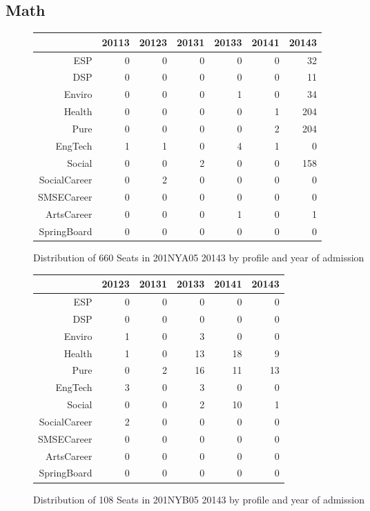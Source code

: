 \documentclass{article}\usepackage[]{graphicx}\usepackage[]{color}
\begin{document}
\subsection{Math}
\begin{figure}[H]
\centering
\begin{tabular}{rrrrrrr}
  \hline
 & 20113 & 20123 & 20131 & 20133 & 20141 & 20143 \\ 
  \hline
ESP &   0 &   0 &   0 &   0 &   0 &  32 \\ 
  DSP &   0 &   0 &   0 &   0 &   0 &  11 \\ 
  Enviro &   0 &   0 &   0 &   1 &   0 &  34 \\ 
  Health &   0 &   0 &   0 &   0 &   1 & 204 \\ 
  Pure &   0 &   0 &   0 &   0 &   2 & 204 \\ 
  EngTech &   1 &   1 &   0 &   4 &   1 &   0 \\ 
  Social &   0 &   0 &   2 &   0 &   0 & 158 \\ 
  SocialCareer &   0 &   2 &   0 &   0 &   0 &   0 \\ 
  SMSECareer &   0 &   0 &   0 &   0 &   0 &   0 \\ 
  ArtsCareer &   0 &   0 &   0 &   1 &   0 &   1 \\ 
  SpringBoard &   0 &   0 &   0 &   0 &   0 &   0 \\ 
   \hline
\end{tabular}
\caption{Distribution of 660 Seats in 201NYA05 20143 by profile and year of admission} 
\end{figure}
\begin{figure}[H]
\centering
\begin{tabular}{rrrrrr}
  \hline
 & 20123 & 20131 & 20133 & 20141 & 20143 \\ 
  \hline
ESP &   0 &   0 &   0 &   0 &   0 \\ 
  DSP &   0 &   0 &   0 &   0 &   0 \\ 
  Enviro &   1 &   0 &   3 &   0 &   0 \\ 
  Health &   1 &   0 &  13 &  18 &   9 \\ 
  Pure &   0 &   2 &  16 &  11 &  13 \\ 
  EngTech &   3 &   0 &   3 &   0 &   0 \\ 
  Social &   0 &   0 &   2 &  10 &   1 \\ 
  SocialCareer &   2 &   0 &   0 &   0 &   0 \\ 
  SMSECareer &   0 &   0 &   0 &   0 &   0 \\ 
  ArtsCareer &   0 &   0 &   0 &   0 &   0 \\ 
  SpringBoard &   0 &   0 &   0 &   0 &   0 \\ 
   \hline
\end{tabular}
\caption{Distribution of 108 Seats in 201NYB05 20143 by profile and year of admission} 
\end{figure}
\end{document}
